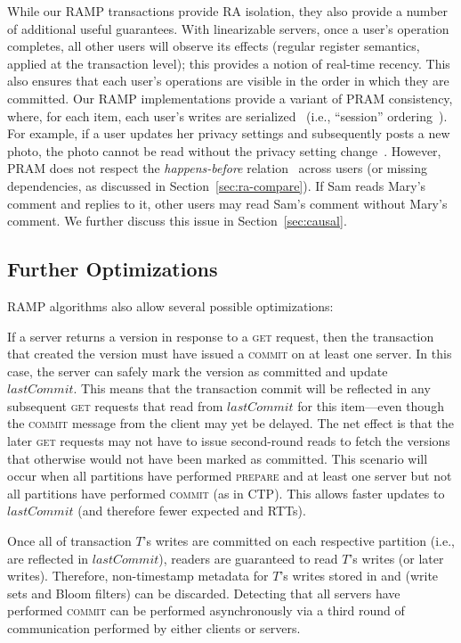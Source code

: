 While our RAMP transactions provide RA isolation, they also provide a
number of additional useful guarantees. With linearizable servers,
once a user's operation completes, all other users will observe its
effects (regular register semantics, applied at the transaction
level); this provides a notion of real-time recency. This also ensures
that each user's operations are visible in the order in which they are
committed. Our RAMP implementations provide a variant of PRAM
consistency, where, for each item, each user's writes are
serialized~\cite{pram} (i.e., ``session''
ordering~\cite{daudjee-session}). For example, if a user updates her
privacy settings and subsequently posts a new photo, the photo cannot
be read without the privacy setting change~\cite{pnuts}. However, PRAM
does not respect the \textit{happens-before}
relation~\cite{lamportclocks} across users (or missing dependencies, as
discussed in Section~\ref{sec:ra-compare}). If Sam reads Mary's
comment and replies to it, other users may read Sam's comment without
Mary's comment. We further discuss this issue in
Section~\ref{sec:causal}.

\subsection{Further Optimizations}
\label{sec:optimizations}

\noindent RAMP algorithms also allow several possible optimizations:

 If a server returns a version in
response to a \textsc{get} request, then the transaction that created
the version must have issued a \textsc{commit} on at least one
server. In this case, the server can safely mark the version as
committed and update $lastCommit$. This means that the transaction
commit will be reflected in any subsequent \textsc{get} requests that
read from $lastCommit$ for this item---even though the \textsc{commit}
message from the client may yet be delayed. The net effect is that the
later \textsc{get} requests may not have to issue second-round reads
to fetch the versions that otherwise would not have been marked as
committed. This scenario will occur when all partitions have performed
\textsc{prepare} and at least one server but not all partitions have
performed \textsc{commit} (as in CTP). This allows faster updates to
$lastCommit$ (and therefore fewer expected \rapl and \rapb RTTs).

 Once all of transaction $T$'s
writes are committed on each respective partition (i.e., are reflected in
$lastCommit$), readers are guaranteed to read $T$'s writes (or later
writes). Therefore, non-timestamp metadata for $T$'s writes stored in
\rapl and \rapb (write sets and Bloom filters) can be
discarded. Detecting that all servers have performed \textsc{commit}
can be performed asynchronously via a third round of communication
performed by either clients or servers.

